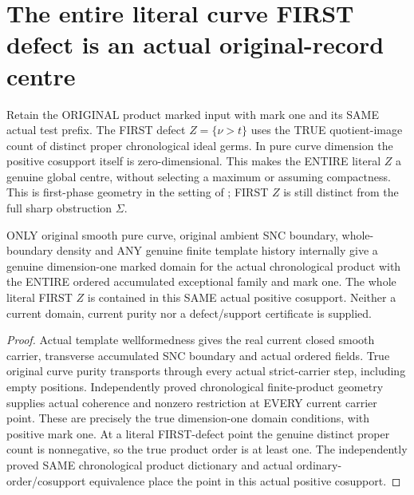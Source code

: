 \section{The entire literal curve FIRST defect is an actual original-record centre}

Retain the ORIGINAL product marked input with mark one and its SAME actual
test prefix. The FIRST defect $Z=\{\nu>t\}$ uses the TRUE quotient-image
count of distinct proper chronological ideal germs. In pure curve
dimension the positive cosupport itself is zero-dimensional. This makes
the ENTIRE literal $Z$ a genuine global centre, without selecting a
maximum or assuming compactness. This is first-phase geometry in the
setting of \cite[pp.~293--295]{bierstone-milman97-invent-math}; FIRST $Z$
is still distinct from the full sharp obstruction $\Sigma$.

\begin{lemma}
\label{hir:sharp-actual-curve-product-domain-first-defect-cosupport}
\leanok
ONLY original smooth pure curve, original ambient SNC boundary,
whole-boundary density and ANY genuine finite template history internally
give a genuine dimension-one marked domain for the actual chronological
product with the ENTIRE ordered accumulated exceptional family and mark
one. The whole literal FIRST $Z$ is contained in this SAME actual positive
cosupport. Neither a current domain, current purity nor a defect/support
certificate is supplied.
\end{lemma}
\begin{proof}
Actual template wellformedness gives the real current closed smooth
carrier, transverse accumulated SNC boundary and actual ordered fields.
True original curve purity transports through every actual strict-carrier
step, including empty positions. Independently proved chronological
finite-product geometry supplies actual coherence and nonzero restriction
at EVERY current carrier point. These are precisely the true
dimension-one domain conditions, with positive mark one. At a literal
FIRST-defect point the genuine distinct proper count is nonnegative, so
the true product order is at least one. The independently proved SAME
chronological product dictionary and actual ordinary-order/cosupport
equivalence place the point in this actual positive cosupport.
\end{proof}

